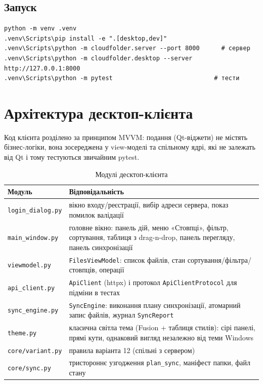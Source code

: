 \documentclass[12pt,a4paper]{article}
\begin{document}
\subsection{Запуск}

\begin{Verbatim}[fontsize=\small,frame=single]
python -m venv .venv
.venv\Scripts\pip install -e ".[desktop,dev]"
.venv\Scripts\python -m cloudfolder.server --port 8000      # сервер
.venv\Scripts\python -m cloudfolder.desktop --server http://127.0.0.1:8000
.venv\Scripts\python -m pytest                            # тести
\end{Verbatim}


\section{Архітектура десктоп-клієнта}

Код клієнта розділено за принципом MVVM: подання (Qt-віджети) не містять бізнес-логіки, вона зосереджена у view-моделі та спільному ядрі, які не залежать від Qt і тому тестуються звичайним pytest.

{\small
\begin{longtable}{@{}p{4.5cm}p{11.5cm}@{}}
\caption{Модулі десктоп-клієнта}\\
\toprule
\textbf{Модуль} & \textbf{Відповідальність} \\
\midrule
\endhead
\texttt{login\_dialog.py} & вікно входу/реєстрації, вибір адреси сервера, показ помилок валідації \\ \midrule
\texttt{main\_window.py} & головне вікно: панель дій, меню «Стовпці», фільтр, сортування, таблиця з drag-n-drop, панель перегляду, панель синхронізації \\ \midrule
\texttt{viewmodel.py} & \texttt{FilesViewModel}: список файлів, стан сортування/фільтра/стовпців, операції \\ \midrule
\texttt{api\_client.py} & \texttt{ApiClient} (httpx) і протокол \texttt{ApiClientProtocol} для підміни в тестах \\ \midrule
\texttt{sync\_engine.py} & \texttt{SyncEngine}: виконання плану синхронізації, атомарний запис файлів, журнал \texttt{SyncReport} \\ \midrule
\texttt{theme.py} & класична світла тема (Fusion + таблиця стилів): сірі панелі, прямі кути, однаковий вигляд незалежно від теми Windows \\ \midrule
\texttt{core/\allowbreak{}variant.py} & правила варіанта 12 (спільні з сервером) \\ \midrule
\texttt{core/\allowbreak{}sync.py} & тристороннє узгодження \texttt{plan\_sync}, маніфест папки, файл стану \\ \midrule
\bottomrule
\end{longtable}}
\end{document}
